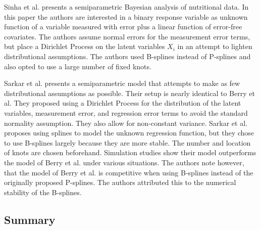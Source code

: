 \documentclass[11pt]{article}\usepackage[]{graphicx}\usepackage[]{color}
\begin{document}
Sinha et al. \cite{sinha10} presents a semiparametric Bayesian analysis of nutritional data. In this paper the authors are interested in a binary response variable as unknown function of a variable measured with error plus a linear function of error-free covariates. The authors assume normal errors for the measurement error terms, but place a Dirichlet Process on the latent variables $X_i$ in an attempt to lighten distributional assumptions. The authors used B-splines instead of P-splines and also opted to use a large number of fixed knots. 


Sarkar et al. \cite{sarkar14} presents a semiparametric model that attempts to make as few distributional assumptions as possible. Their setup is nearly identical to Berry et al. They proposed using a Dirichlet Process for the distribution of the latent variables, measurement error, and regression error terms to avoid the standard normality assumption. They also allow for non-constant variance. Sarkar et al. proposes using splines to model the unknown regression function, but they chose to use B-splines largely because they are more stable. The number and location of knots are chosen beforehand. Simulation studies show their model outperforms the model of Berry et al. under various situations. The authors note however, that the model of Berry et al. is competitive when using B-splines instead of the originally proposed P-splines. The authors attributed this to the numerical stability of the B-splines.


\subsection{Summary}




\end{document}
